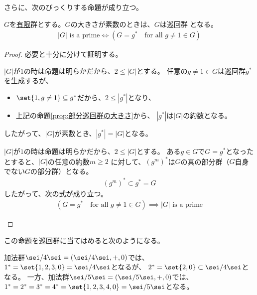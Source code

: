 	さらに、次のびっくりする命題が成り立つ。

	\begin{proposition}[部分巡回群の大きさと素数]
	\label{prop:部分巡回群の大きさと素数} %
		$G$を\underline{有限}群とする。$G$の大きさが素数のときは、$G$は巡回群
		となる。
		\begin{equation*}\begin{split} %
			|G| \text{ is a prime} 
			\iff (G = g^* \quad\text{for all }g\neq 1\in G)
		\end{split}\end{equation*} %
	\end{proposition} %
	\begin{proof} 必要と十分に分けて証明する。
	\begin{description}\setlength{\itemsep}{-1mm} %
		\item[$|G|$が素数$\implies$...]
		$|G|$が$1$の時は命題は明らかだから、$2\le|G|$とする。
		任意の$g\neq1\in G$は巡回群$g^*$を生成するが、
		\begin{itemize}\setlength{\itemsep}{-1mm} %
			\item $\set{1,g\neq 1}\subseteq g^*$だから、$2\le|g^*|$となり、
			\item 上記の命題\ref{prop:部分巡回群の大きさ}から、
			$|g^*|$は$|G|$の約数となる。
		\end{itemize} %
		したがって、$|G|$が素数とき、$|g^*|=|G|$となる。
		\item[...$\implies|G|$が素数]
		$|G|$が$1$の時は命題は明らかだから、$2\le|G|$とする。
		ある$g\in G$で$G=g^*$となったとすると、$|G|$の任意の約数$m\ge2$
		に対して、$(g^m)^*$は$G$の真の部分群（$G$自身でない$G$の部分群）となる。
		\begin{equation*}\begin{split}
			(g^m)^*\subset g^*=G
		\end{split}\end{equation*}
		したがって、次の式が成り立つ。
		\begin{equation*}\begin{split}
			(G = g^* \quad\text{for all }g\neq 1\in G)
			\implies |G| \text{ is a prime} 
		\end{split}\end{equation*}
	\end{description} %
	\end{proof}

	この命題を巡回群に当てはめると次のようになる。

	\begin{example}[巡回群の大きさと部分群の関係]
	\label{eg:巡回群の大きさと部分群の関係} %
		加法群$\sei/4\sei=(\sei/4\sei,+,0)$では、
		$1^*=\set{1,2,3,0}=\sei/4\sei$となるが、
		$2^*=\set{2,0}\subset\sei/4\sei$となる。
		一方、加法群$\sei/5\sei=(\sei/5\sei,+,0)$では、
		$1^*=2^*=3^*=4^*=\set{1,2,3,4,0}=\sei/5\sei$となる。
	\end{example} %

